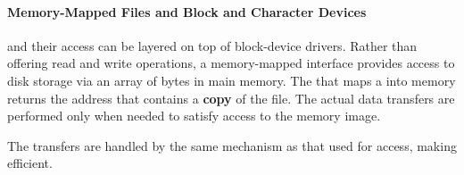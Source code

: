 \paragraph{Memory-Mapped Files and Block and Character Devices}\label{par:Memory_Mapped_Files_Block_Char_Devices}
 and their access can be layered on top of block-device drivers.
Rather than offering read and write operations, a memory-mapped interface provides access to disk storage via an array of bytes in main memory.
The  that maps a  into memory returns the  address that contains a \textbf{copy} of the file.
The actual data transfers are performed only when needed to satisfy access to the memory image.

The transfers are handled by the same mechanism as that used for   access, making  efficient.

